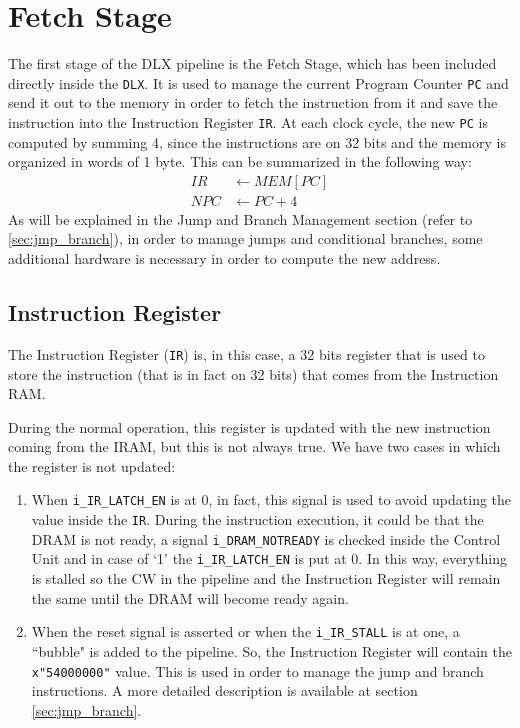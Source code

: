 \chapter{Fetch Stage}
The first stage of the DLX pipeline is the Fetch Stage, which has been included directly inside the \texttt{DLX}. It is used to manage the current Program Counter \texttt{PC} and send it out to the memory in order to fetch the instruction from it and save the instruction into the Instruction Register \texttt{IR}. At each clock cycle, the new \texttt{PC} is computed by summing 4, since the instructions are on 32 bits and the memory is organized in words of 1 byte. This can be summarized in the following way:
\begin{align*}
	IR &\leftarrow MEM[PC]\\
	NPC &\leftarrow PC + 4
\end{align*}
As will be explained in the Jump and Branch Management section (refer to \ref{sec:jmp_branch}), in order to manage jumps and conditional branches, some additional hardware is necessary in order to compute the new address.

\section{Instruction Register}
The Instruction Register (\texttt{IR}) is, in this case, a 32 bits register that is used to store the instruction (that is in fact on 32 bits) that comes from the Instruction RAM.

During the normal operation, this register is updated with the new instruction coming from the IRAM, but this is not always true. We have two cases in which the register is not updated:
\begin{enumerate}
	\item When \texttt{i\_IR\_LATCH\_EN} is at 0, in fact, this signal is used to avoid updating the value inside the \texttt{IR}. During the instruction execution, it could be that the DRAM is not ready, a signal \texttt{i\_DRAM\_NOTREADY} is checked inside the Control Unit and in case of `1' the \texttt{i\_IR\_LATCH\_EN} is put at 0. In this way, everything is stalled so the CW in the pipeline and the Instruction Register will remain the same until the DRAM will become ready again. 
	\item When the reset signal is asserted or when the \texttt{i\_IR\_STALL} is at one, a ``bubble" is added to the pipeline. So, the Instruction Register will contain the \texttt{x"54000000"} value. This is used in order to manage the jump and branch instructions. A more detailed description is available at section \ref{sec:jmp_branch}.
\end{enumerate}

